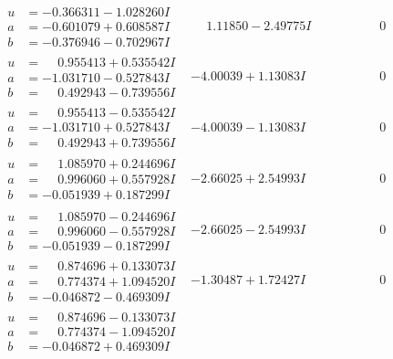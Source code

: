 \documentclass[1p]{elsarticle_modified}
\theoremstyle{definition}
\begin{document}
$$\begin{array}{c|c|c}
\begin{aligned}
u &= -0.366311 - 1.028260 I \\
a &= -0.601079 + 0.608587 I \\
b &= -0.376946 - 0.702967 I\end{aligned}
 & \phantom{-}1.11850 - 2.49775 I & \phantom{-0.000000 } 0 \\ \hline\begin{aligned}
u &= \phantom{-}0.955413 + 0.535542 I \\
a &= -1.031710 - 0.527843 I \\
b &= \phantom{-}0.492943 - 0.739556 I\end{aligned}
 & -4.00039 + 1.13083 I & \phantom{-0.000000 } 0 \\ \hline\begin{aligned}
u &= \phantom{-}0.955413 - 0.535542 I \\
a &= -1.031710 + 0.527843 I \\
b &= \phantom{-}0.492943 + 0.739556 I\end{aligned}
 & -4.00039 - 1.13083 I & \phantom{-0.000000 } 0 \\ \hline\begin{aligned}
u &= \phantom{-}1.085970 + 0.244696 I \\
a &= \phantom{-}0.996060 + 0.557928 I \\
b &= -0.051939 + 0.187299 I\end{aligned}
 & -2.66025 + 2.54993 I & \phantom{-0.000000 } 0 \\ \hline\begin{aligned}
u &= \phantom{-}1.085970 - 0.244696 I \\
a &= \phantom{-}0.996060 - 0.557928 I \\
b &= -0.051939 - 0.187299 I\end{aligned}
 & -2.66025 - 2.54993 I & \phantom{-0.000000 } 0 \\ \hline\begin{aligned}
u &= \phantom{-}0.874696 + 0.133073 I \\
a &= \phantom{-}0.774374 + 1.094520 I \\
b &= -0.046872 - 0.469309 I\end{aligned}
 & -1.30487 + 1.72427 I & \phantom{-0.000000 } 0 \\ \hline\begin{aligned}
u &= \phantom{-}0.874696 - 0.133073 I \\
a &= \phantom{-}0.774374 - 1.094520 I \\
b &= -0.046872 + 0.469309 I\end{aligned}

\end{array}$$
\end{document}
